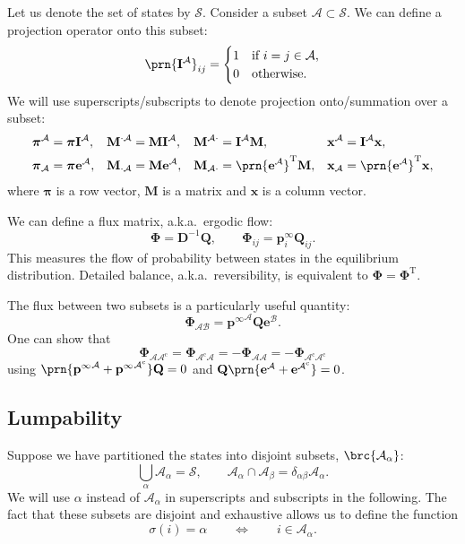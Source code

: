 \documentclass[9pt,twocolumn,twoside,lineno]{pnas-new}
\newcommand{\means}{\Longleftrightarrow}
\newcommand{\inv}{^{-1}}
\newcommand{\trans}{^\mathrm{T}}
\newcommand{\I}{\mathbf{I}}
\newcommand{\onev}{\mathbf{e}}
\newcommand{\MM}{\mathbf{Q}}
\newcommand{\prob}{\mathbf{p}}
\newcommand{\eq}{\prob^\infty}
\newcommand{\D}{\mathbf{D}}
\newcommand{\pib}{\boldsymbol{\pi}}
\newcommand{\M}{\mathbf{M}}
\newcommand{\F}{\boldsymbol{\Phi}}
\newcommand{\CS}{\mathcal{S}}
\newcommand{\CA}{\mathcal{A}}
\newcommand{\CB}{\mathcal{B}}
\newcommand{\comp}{^\mathrm{c}}
\begin{document}
\begin{strip}
Let us denote the set of states by $\CS$.
Consider a subset $\CA\subset\CS$.
We can define a projection operator onto this subset:
%
\begin{equation}\label{eq:proj}
  \prn{\I^\CA}_{ij} =
    \begin{cases}
      1 &\text{if $i=j\in\CA$,}\\
      0 &\text{otherwise.}
    \end{cases}
\end{equation}
%
We will use superscripts/subscripts to denote projection onto/summation over a subset:
%
\begin{equation}\label{eq:projsum}
  \begin{aligned}
    \pib^\CA &=\pib\I^\CA, &
    \M^{\cdot\CA}&=\M\I^\CA, &
    \M^{\CA\cdot}&=\I^\CA\M, &
    \mathbf{x}^\CA &= \I^\CA\mathbf{x},
    \\
    \pib_\CA &=\pib\onev^\CA, &
    \M_{\cdot\CA}&=\M\onev^\CA, &
    \M_{\CA\cdot}&=\prn{\onev^\CA}\trans\M, &
    \mathbf{x}_\CA &= \prn{\onev^\CA}\trans\mathbf{x},
  \end{aligned}
\end{equation}
%
where $\pib$ is a row vector, $\M$ is a matrix and $\mathbf{x}$ is a column vector.

We can define a flux matrix, a.k.a.\ ergodic flow:
%
\begin{equation}\label{eq:flux:s}
  \F = \D\inv\MM,
  \qquad
  \F_{ij} = \eq_i \MM_{ij}.
\end{equation}
%
This measures the flow of probability between states in the equilibrium distribution.
Detailed balance, a.k.a.\ reversibility, is equivalent to $\F=\F\trans$.

The flux between two subsets is a particularly useful quantity:
%
\begin{equation}\label{eq:subflux}
  \F_{\CA\CB} = {\eq}^\CA\MM\onev^\CB.
\end{equation}
%
One can show that
%
\begin{equation}\label{eq:compflux}
  \F_{\CA\CA\comp} = \F_{\CA\comp\CA} = -\F_{\CA\CA} = -\F_{\CA\comp\CA\comp}
\end{equation}
%
using $\prn{{\eq}^\CA + {\eq}^{\CA\comp}}\MM=0$ and $\MM\prn{{\onev}^\CA + {\onev}^{\CA\comp}}=0$.

\subsection{Lumpability}\label{sec:lump}

Suppose we have partitioned the states into disjoint subsets, $\brc{\CA_\alpha}$:
%
\begin{equation}\label{eq:partition}
  \bigcup_\alpha \CA_\alpha = \CS,
  \qquad
  \CA_\alpha \cap \CA_\beta = \delta_{\alpha\beta}\CA_\alpha.
\end{equation}
%
We will use $\alpha$ instead of $\CA_\alpha$ in superscripts and subscripts in the following.
The fact that these subsets are disjoint and exhaustive allows us to define the function
%
\begin{equation}\label{eq:whichsey}
  \sigma(i)=\alpha
  \qquad\means\qquad
  i\in\CA_\alpha.
\end{equation}
%


\end{strip}
\end{document}
